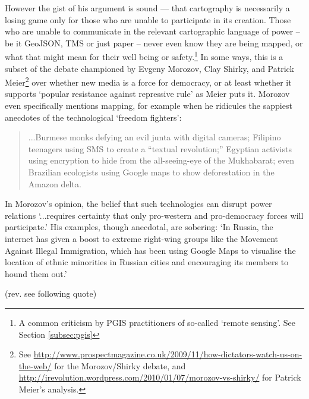 \documentclass[11pt,oneside,notitlepage]{report}
\begin{document}
{{However the gist of his argument is sound --- that cartography is necessarily a losing game only for those who are unable to participate in its creation. Those who are unable to communicate in the relevant cartographic language of power -- be it GeoJSON, \ac{TMS} or just paper -- never even know they are being mapped, or what that might mean for their well being or safety.\footnote{A common criticism by \ac{PGIS} practitioners of so-called `remote sensing'. See Section \ref{subsec:pgis}} In some ways, this is a subset of the debate championed by Evgeny Morozov, Clay Shirky, and Patrick Meier\footnote{See \url{http://www.prospectmagazine.co.uk/2009/11/how-dictators-watch-us-on-the-web/} for the Morozov/Shirky debate, and \url{http://irevolution.wordpress.com/2010/01/07/morozov-vs-shirky/} for Patrick Meier's analysis.} over whether new media is a force for democracy, or at least whether it supports `popular resistance against repressive rule' as Meier puts it. \cite{meier2010popular} Morozov even specifically mentions mapping, for example when he ridicules the sappiest anecdotes of the technological `freedom fighters': 
 
\begin{quote}
...Burmese monks defying an evil junta with digital cameras; Filipino teenagers using SMS to create a “textual revolution;” Egyptian activists using encryption to hide from the all-seeing-eye of the Mukhabarat; even Brazilian ecologists using Google maps to show deforestation in the Amazon delta. \cite{morozov2009dictators}
\end{quote}

In Morozov's opinion, the belief that such technologies can disrupt power relations `...requires certainty that only pro-western and pro-democracy forces will participate.' His examples, though anecdotal, are sobering: `In Russia, the internet has given a boost to extreme right-wing groups like the Movement Against Illegal Immigration, which has been using Google Maps to visualise the location of ethnic minorities in Russian cities and encouraging its members to hound them out.' 

(rev. see following quote)

}}
\end{document}
